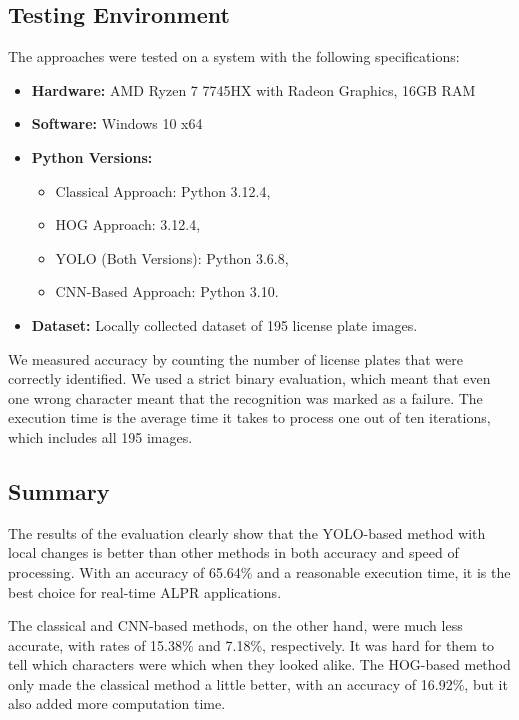 \documentclass[runningheads]{llncs}
\begin{document}
\subsection{Testing Environment}
The approaches were tested on a system with the following specifications:
\begin{itemize}
    \item \textbf{Hardware:} AMD Ryzen 7 7745HX with Radeon Graphics, 16GB RAM
    \item \textbf{Software:} Windows 10 x64
    \item \textbf{Python Versions:} 
        \begin{itemize}
            \item Classical Approach: Python 3.12.4,
            \item HOG Approach: 3.12.4,
            \item YOLO (Both Versions): Python 3.6.8,
            \item CNN-Based Approach: Python 3.10.
        \end{itemize}
    \item \textbf{Dataset:} Locally collected dataset of 195 license plate images.
\end{itemize}

We measured accuracy by counting the number of license plates that were correctly identified. We used a strict binary evaluation, which meant that even one wrong character meant that the recognition was marked as a failure. The execution time is the average time it takes to process one out of ten iterations, which includes all 195 images.

\subsection{Summary}

The results of the evaluation clearly show that the YOLO-based method with local changes is better than other methods in both accuracy and speed of processing. With an accuracy of 65.64\% and a reasonable execution time, it is the best choice for real-time ALPR applications.

The classical and CNN-based methods, on the other hand, were much less accurate, with rates of 15.38\% and 7.18\%, respectively. It was hard for them to tell which characters were which when they looked alike. The HOG-based method only made the classical method a little better, with an accuracy of 16.92\%, but it also added more computation time.
\end{document}
